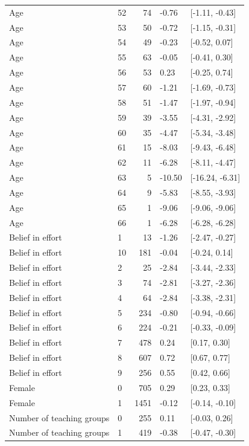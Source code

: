 \begin{tabular}{llrll}
\addlinespace
Age & 52 & 74 & -0.76 & {}[-1.11, -0.43]\\
Age & 53 & 50 & -0.72 & {}[-1.15, -0.31]\\
Age & 54 & 49 & -0.23 & {}[-0.52, 0.07]\\
Age & 55 & 63 & -0.05 & {}[-0.41, 0.30]\\
Age & 56 & 53 & 0.23 & {}[-0.25, 0.74]\\
\addlinespace
Age & 57 & 60 & -1.21 & {}[-1.69, -0.73]\\
Age & 58 & 51 & -1.47 & {}[-1.97, -0.94]\\
Age & 59 & 39 & -3.55 & {}[-4.31, -2.92]\\
Age & 60 & 35 & -4.47 & {}[-5.34, -3.48]\\
Age & 61 & 15 & -8.03 & {}[-9.43, -6.48]\\
\addlinespace
Age & 62 & 11 & -6.28 & {}[-8.11, -4.47]\\
Age & 63 & 5 & -10.50 & {}[-16.24, -6.31]\\
Age & 64 & 9 & -5.83 & {}[-8.55, -3.93]\\
Age & 65 & 1 & -9.06 & {}[-9.06, -9.06]\\
Age & 66 & 1 & -6.28 & {}[-6.28, -6.28]\\
\addlinespace
Belief in effort & 1 & 13 & -1.26 & {}[-2.47, -0.27]\\
Belief in effort & 10 & 181 & -0.04 & {}[-0.24, 0.14]\\
Belief in effort & 2 & 25 & -2.84 & {}[-3.44, -2.33]\\
Belief in effort & 3 & 74 & -2.81 & {}[-3.27, -2.36]\\
Belief in effort & 4 & 64 & -2.84 & {}[-3.38, -2.31]\\
\addlinespace
Belief in effort & 5 & 234 & -0.80 & {}[-0.94, -0.66]\\
Belief in effort & 6 & 224 & -0.21 & {}[-0.33, -0.09]\\
Belief in effort & 7 & 478 & 0.24 & {}[0.17, 0.30]\\
Belief in effort & 8 & 607 & 0.72 & {}[0.67, 0.77]\\
Belief in effort & 9 & 256 & 0.55 & {}[0.42, 0.66]\\
\addlinespace
Female & 0 & 705 & 0.29 & {}[0.23, 0.33]\\
Female & 1 & 1451 & -0.12 & {}[-0.14, -0.10]\\
Number of teaching groups & 0 & 255 & 0.11 & {}[-0.03, 0.26]\\
Number of teaching groups & 1 & 419 & -0.38 & {}[-0.47, -0.30]\\

\end{tabular}
